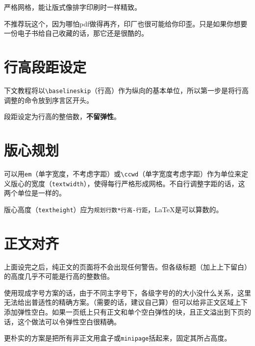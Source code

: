 \documentclass[10pt,openany]{book}
\begin{document}
严格网格，能让版式像排字印刷时一样精致。

不推荐玩这个，因为哪怕pdf做得再齐，印厂也很可能给你印歪。只是如果你想要一份电子书给自己收藏的话，那它还是很酷的。

\section{行高段距设定}

下文教程将以\texttt{\textbackslash{}baselineskip}（行高）作为纵向的基本单位，所以第一步是将行高调整的命令放到序言区开头。



段距设定为行高的整倍数，\textbf{不留弹性}。



\section{版心规划}

可以用\texttt{em}（单字宽度，不考虑字距）或\texttt{\textbackslash{}ccwd}（单字宽度考虑字距）作为单位来定义版心的宽度（\texttt{textwidth}），使得每行严格形成网格。不自行调整字距的话，这两个单位是一样的。

版心高度（\texttt{textheight}）应为\texttt{规划行数*行高-行距}，\LaTeX 是可以算数的。



\section{正文对齐}

上面设完之后，纯正文的页面将不会出现任何警告。但各级标题（加上上下留白）的高度几乎不可能是行高的整数倍。

使用现成字号方案的话，由于不同主字号下，各级字号的的大小没什么关系，这里无法给出普适性的精确方案。（需要的话，建议自己算）但可以给非正文区域上下添加弹性空白。如果一页纸上只有正文和单个空白弹性的块，且正文溢出到下页的话，这个做法可以令弹性空白很精确。



更朴实的方案是把所有非正文用盒子或\texttt{minipage}括起来，固定其所占高度。



\stopcontents[tutorial]

\listoftables
\listoffigures
\lstlistoflistings
\end{document}
